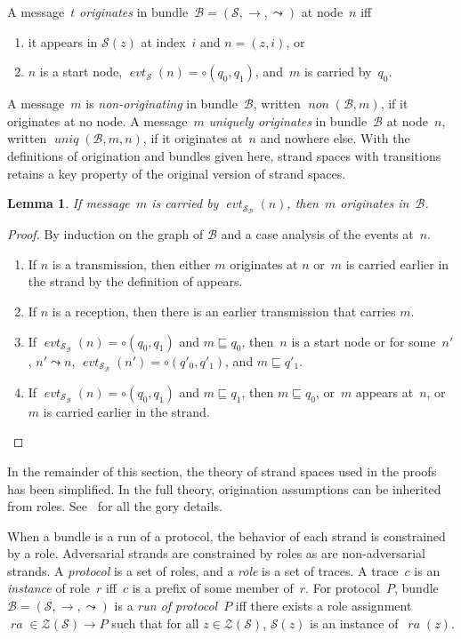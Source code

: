 \documentclass[12pt]{article}
\newtheorem{lem}[thm]{Lemma}
\newcommand{\fn}[1]{\ensuremath{\operatorname{\mathit{#1}}}}
\newcommand{\neutral}{\mathord\circ}
\newcommand{\ssp}{\ensuremath{\mathcal{S}}}
\newcommand{\bun}{\ensuremath{\mathcal{B}}}
\newcommand{\strands}{\ensuremath{\mathcal{Z}}}
\newcommand{\evt}{\fn{evt}}
\newcommand{\ra}{\fn{ra}}
\begin{document}
A message~$t$ \emph{originates} in
bundle~$\bun=(\ssp,\to,\leadsto)$ at node~$n$ iff
\begin{enumerate}
\item it appears in $\ssp(z)$ at index~$i$ and $n=(z,i)$, or
\item $n$ is a start node, $\evt_\ssp(n)=\neutral(q_0,q_1)$, and~$m$ is
  carried by~$q_0$.
\end{enumerate}
A message~$m$ is \emph{non-originating} in bundle~$\bun$, written
$\fn{non}(\bun,m)$, if it originates at no node.  A message~$m$
\emph{uniquely originates} in bundle~$\bun$ at node~$n$, written
$\fn{uniq}(\bun,m,n)$, if it originates at~$n$ and nowhere else.
With the definitions of origination and bundles given here, strand
spaces with transitions retains a key property of the original version
of strand spaces.

\begin{lem}\label{lem:carried originates}
  If message~$m$ is carried by $\evt_{\ssp_\bun}(n)$, then~$m$
  originates in~\bun.
\end{lem}
\begin{proof}
  By induction on the graph of {\bun} and a case analysis of the events at~$n$.
  \begin{enumerate}
  \item If $n$ is a transmission, then either $m$ originates at $n$ or~$m$
    is carried earlier in the strand by the definition of appears.
  \item If $n$ is a reception, then there is an earlier transmission
    that carries $m$.
  \item If $\evt_{\ssp_\bun}(n)=\neutral(q_0,q_1)$ and $m\sqsubseteq q_0$,
    then~$n$ is a start node or for some~$n'$, $n'\leadsto n$,
    $\evt_{\ssp_\bun}(n')=\neutral(q'_0,q'_1)$, and $m\sqsubseteq q'_1$.
  \item If $\evt_{\ssp_\bun}(n)=\neutral(q_0,q_1)$ and $m\sqsubseteq q_1$,
    then $m\sqsubseteq q_0$, or~$m$ appears at~$n$, or~$m$ is carried
    earlier in the strand.
  \end{enumerate}
  \vspace{-4.4ex}
\end{proof}

In the remainder of this section, the theory of strand spaces used in
the proofs has been simplified.  In the full theory, origination
assumptions can be inherited from roles.  See~\cite{Ramsdell13} for
all the gory details.

When a bundle is a run of a protocol, the behavior of each strand is
constrained by a role.  Adversarial strands are constrained by roles
as are non-adversarial strands.  A \emph{protocol} is a set of roles,
and a \emph{role} is a set of traces.  A trace~$c$ is an
\emph{instance} of role~$r$ iff~$c$ is a prefix of some member of~$r$.
For protocol~$P$, bundle $\bun=(\ssp,\to,\leadsto)$ is a \emph{run of
  protocol}~$P$ iff there exists a role assignment $\ra\in
\strands(\ssp)\to P$ such that for all $z\in\strands(\ssp)$, $\ssp(z)$ is an
instance of~$\ra(z)$.
\end{document}
